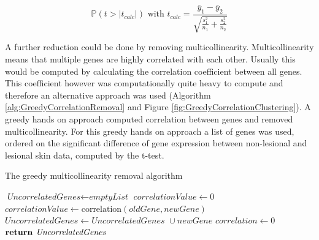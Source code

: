 \documentclass[10pt,a4paper]{report}
\begin{document}
	\begin{equation}
	\label{eq:UnequalVarianceTTest}
	\mathbb{P}(t >|t_{calc}|) \text { with } t_{calc} = \frac{\bar{y}_1 - 
		\bar{y}_2}{\sqrt{\frac{s^2_1}{n_1} + \frac{s^2_2}{n_2}}} 
	\end{equation}
	
	A further reduction could be done by removing multicollinearity. Multicollinearity means that multiple genes are highly correlated with each other. Usually this would be computed by calculating the correlation coefficient between all genes. This coefficient however was computationally quite heavy to compute and therefore an alternative approach was used (Algorithm \ref{alg:GreedyCorrelationRemoval} and Figure \ref{fig:GreedyCorrelationClustering}). A greedy hands on approach computed correlation between genes and removed multicollinearity. For this greedy hands on approach a list of genes was used, ordered on the significant difference of gene expression between non-lesional and lesional skin data, computed by the t-test.
	
	\begin{algorithm}[H]
		\caption{The greedy multicollinearity removal algorithm}\label{alg:GreedyCorrelationRemoval}
		\begin{algorithmic}[1]
			\State $\textit{UncorrelatedGenes} \gets \textit{emptyList}$
			\State $\textit{correlationValue} \gets 0$
			\State $\textit{correlationValue} \gets \text{correlation}(\textit{oldGene}, newGene)$
			\EndIf
			\EndFor
			\State $\textit{UncorrelatedGenes} \gets \textit{UncorrelatedGenes } \cup newGene$
			\EndIf
			\State $\textit{correlation} \gets 0$
			\EndFor
			\State $\textbf{return } \emph{UncorrelatedGenes}$
			\EndProcedure
		\end{algorithmic}
	\end{algorithm}
	
\end{document}

